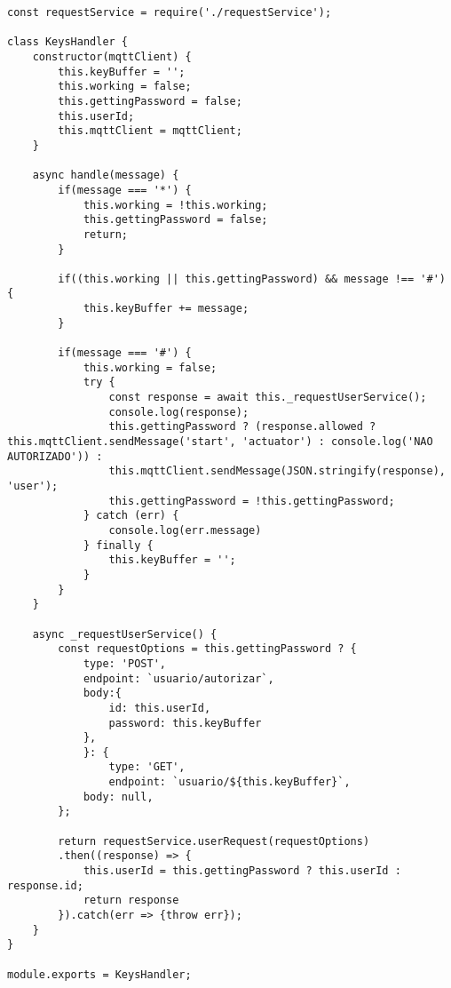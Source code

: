 \begin{lstlisting}[caption=Exemplo do código que lida com a comunicação com o InfluxDB]
const requestService = require('./requestService');

class KeysHandler {
	constructor(mqttClient) {
		this.keyBuffer = '';
		this.working = false;
		this.gettingPassword = false;
		this.userId;
		this.mqttClient = mqttClient;
	}
	
	async handle(message) {
		if(message === '*') {
			this.working = !this.working;
			this.gettingPassword = false;
			return;
		}
	
		if((this.working || this.gettingPassword) && message !== '#') {
			this.keyBuffer += message;
		}
		
		if(message === '#') {
			this.working = false;
			try {
				const response = await this._requestUserService();
				console.log(response);
				this.gettingPassword ? (response.allowed ? this.mqttClient.sendMessage('start', 'actuator') : console.log('NAO AUTORIZADO')) : 
				this.mqttClient.sendMessage(JSON.stringify(response), 'user');
				this.gettingPassword = !this.gettingPassword;
			} catch (err) {
				console.log(err.message)
			} finally {
				this.keyBuffer = '';
			}
		}
	}
	
	async _requestUserService() {
		const requestOptions = this.gettingPassword ? {
			type: 'POST',
			endpoint: `usuario/autorizar`,
			body:{
				id: this.userId,
				password: this.keyBuffer
			},
			}: {
				type: 'GET',
				endpoint: `usuario/${this.keyBuffer}`,
			body: null,
		};
		
		return requestService.userRequest(requestOptions)
		.then((response) => {
			this.userId = this.gettingPassword ? this.userId : response.id;
			return response
		}).catch(err => {throw err});
	}
}

module.exports = KeysHandler;
\end{lstlisting}

%
%
%

